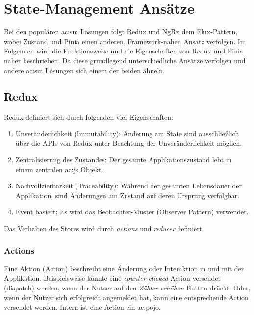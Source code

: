 \chapter{State-Management Ansätze} \label{sm-ansaetze}

Bei den populären \acrshort{ac:sm} Lösungen folgt Redux und NgRx dem Flux-Pattern\cite{historyOfRedux}\cite{ngrxGettingStarted}, wobei Zustand und Pinia einen anderen, Framework-nahen Ansatz verfolgen. Im Folgenden wird die Funktionsweise und die Eigenschaften von Redux und Pinia näher beschrieben. Da diese grundlegend unterschiedliche Ansätze verfolgen und andere \acrshort{ac:sm} Lösungen sich einem der beiden ähneln.

\section{Redux}

Redux definiert sich durch folgenden vier Eigenschaften:
\begin{enumerate}
  \item Unveränderlichkeit (Immutability): Änderung am State sind ausschließlich über die APIs von Redux unter Beachtung der Unveränderlichkeit möglich.
  \item Zentralisierung des Zustandes: Der gesamte Applikationszustand lebt in einem zentralen \acrlong{ac:js} Objekt.
  \item Nachvollzierbarkeit (Traceability): Während der gesamten Lebensdauer der Applikation, sind Änderungen am Zustand auf deren Ursprung verfolgbar.
  \item Event basiert: Es wird das Beobachter-Muster (Observer Pattern) verwendet.
\end{enumerate}

Das Verhalten des Stores wird durch \textit{actions} und \textit{reducer} definiert.

\subsection{Actions}

Eine Aktion (Action) beschreibt eine Änderung oder Interaktion in und mit der Applikation. Beispielsweise könnte eine \textit{counter-clicked} Action versendet (dispatch) werden, wenn der Nutzer auf den \textit{Zähler erhöhen} Button drückt. Oder, wenn der Nutzer sich erfolgreich angemeldet hat, kann eine entsprechende Action versendet werden. Intern ist eine Action ein \acrshort{ac:pojo}.\cite{reduxStateActionReducers}

